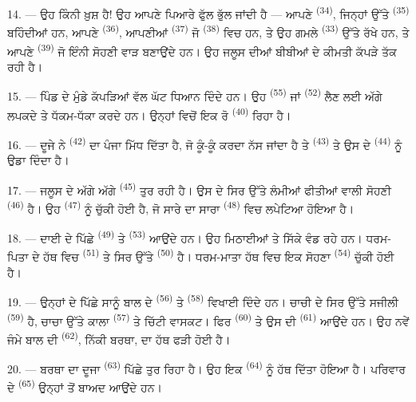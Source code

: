 14. --- ਉਹ ਕਿੰਨੀ ਖ਼ੁਸ਼ ਹੈ! ਉਹ ਆਪਣੇ ਪਿਆਰੇ ਫੁੱਲ ਭੁੱਲ ਜਾਂਦੀ ਹੈ — ਆਪਣੇ
 \textsuperscript{(34)}, ਜਿਨ੍ਹਾਂ ਉੱਤੇ 
\textsuperscript{(35)} ਬਹਿੰਦੀਆਂ ਹਨ, ਆਪਣੇ  \textsuperscript{(36)},
ਆਪਣੀਆਂ  \textsuperscript{(37)} ਜੋ 
\textsuperscript{(38)} ਵਿਚ ਹਨ, ਤੇ ਉਹ ਗਮਲੇ  \textsuperscript{(33)} ਉੱਤੇ
ਰੱਖੇ ਹਨ, ਤੇ ਆਪਣੇ  \textsuperscript{(39)} ਜੋ ਇੰਨੀ ਸੋਹਣੀ ਵਾੜ
ਬਣਾਉਂਦੇ ਹਨ। ਉਹ ਜਲੂਸ ਦੀਆਂ ਬੀਬੀਆਂ ਦੇ ਕੀਮਤੀ ਕੱਪੜੇ ਤੱਕ ਰਹੀ ਹੈ।

15. --- ਪਿੰਡ ਦੇ ਮੁੰਡੇ ਕੱਪੜਿਆਂ ਵੱਲ ਘੱਟ ਧਿਆਨ ਦਿੰਦੇ ਹਨ। ਉਹ 
\textsuperscript{(55)} ਜਾਂ  \textsuperscript{(52)} ਲੈਣ ਲਈ ਅੱਗੇ
ਲਪਕਦੇ ਤੇ ਧੱਕਮ-ਧੱਕਾ ਕਰਦੇ ਹਨ। ਉਨ੍ਹਾਂ ਵਿਚੋਂ ਇਕ ਰੋ \textsuperscript{(40)} ਰਿਹਾ ਹੈ।

16. --- ਦੂਜੇ ਨੇ  \textsuperscript{(42)} ਦਾ ਪੰਜਾ ਮਿੱਧ ਦਿੱਤਾ ਹੈ, ਜੋ
ਕੂੰ-ਕੂੰ ਕਰਦਾ ਨੱਸ ਜਾਂਦਾ ਹੈ ਤੇ  \textsuperscript{(43)} ਤੇ ਉਸ ਦੇ
 \textsuperscript{(44)} ਨੂੰ ਉਡਾ ਦਿੰਦਾ ਹੈ।

\VUsaut{5.0mm}
\VUsaut{4.0mm}

17. --- ਜਲੂਸ ਦੇ ਅੱਗੇ ਅੱਗੇ  \textsuperscript{(45)} ਤੁਰ ਰਹੀ ਹੈ। ਉਸ ਦੇ
ਸਿਰ ਉੱਤੇ ਲੰਮੀਆਂ ਫੀਤੀਆਂ ਵਾਲੀ ਸੋਹਣੀ  \textsuperscript{(46)} ਹੈ। ਉਹ
 \textsuperscript{(47)} ਨੂੰ ਚੁੱਕੀ ਹੋਈ ਹੈ, ਜੋ ਸਾਰੇ ਦਾ ਸਾਰਾ
 \textsuperscript{(48)} ਵਿਚ ਲਪੇਟਿਆ ਹੋਇਆ ਹੈ।

18. --- ਦਾਈ ਦੇ ਪਿੱਛੇ  \textsuperscript{(49)} ਤੇ
 \textsuperscript{(53)} ਆਉਂਦੇ ਹਨ। ਉਹ ਮਿਠਾਈਆਂ ਤੇ ਸਿੱਕੇ ਵੰਡ ਰਹੇ
ਹਨ। ਧਰਮ-ਪਿਤਾ ਦੇ ਹੱਥ ਵਿਚ  \textsuperscript{(51)} ਤੇ ਸਿਰ ਉੱਤੇ
 \textsuperscript{(50)} ਹੈ। ਧਰਮ-ਮਾਤਾ ਹੱਥ ਵਿਚ ਇਕ ਸੋਹਣਾ
 \textsuperscript{(54)} ਚੁੱਕੀ ਹੋਈ ਹੈ।

19. --- ਉਨ੍ਹਾਂ ਦੇ ਪਿੱਛੇ ਸਾਨੂੰ ਬਾਲ ਦੇ  \textsuperscript{(56)} ਤੇ
 \textsuperscript{(58)} ਵਿਖਾਈ ਦਿੰਦੇ ਹਨ। ਚਾਚੀ ਦੇ ਸਿਰ ਉੱਤੇ ਸਜੀਲੀ
 \textsuperscript{(59)} ਹੈ, ਚਾਚਾ ਉੱਤੇ ਕਾਲਾ 
\textsuperscript{(57)} ਤੇ ਚਿੱਟੀ ਵਾਸਕਟ। ਫਿਰ 
\textsuperscript{(60)} ਤੇ ਉਸ ਦੀ  \textsuperscript{(61)} ਆਉਂਦੇ ਹਨ।
ਉਹ ਨਵੇਂ ਜੰਮੇ ਬਾਲ ਦੀ  \textsuperscript{(62)}, ਨਿੱਕੀ ਬਰਥਾ, ਦਾ ਹੱਥ ਫੜੀ
ਹੋਈ ਹੈ।

20. --- ਬਰਥਾ ਦਾ ਦੂਜਾ  \textsuperscript{(63)} ਪਿੱਛੇ ਤੁਰ ਰਿਹਾ ਹੈ। ਉਹ
ਇਕ  \textsuperscript{(64)} ਨੂੰ ਹੱਥ ਦਿੱਤਾ ਹੋਇਆ ਹੈ। ਪਰਿਵਾਰ ਦੇ
 \textsuperscript{(65)} ਉਨ੍ਹਾਂ ਤੋਂ ਬਾਅਦ ਆਉਂਦੇ ਹਨ।

